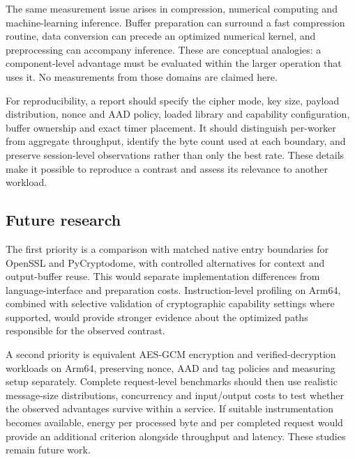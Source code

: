 The same measurement issue arises in compression, numerical computing and machine-learning inference. Buffer preparation can surround a fast compression routine, data conversion can precede an optimized numerical kernel, and preprocessing can accompany inference. These are conceptual analogies: a component-level advantage must be evaluated within the larger operation that uses it. No measurements from those domains are claimed here.

For reproducibility, a report should specify the cipher mode, key size, payload distribution, nonce and AAD policy, loaded library and capability configuration, buffer ownership and exact timer placement. It should distinguish per-worker from aggregate throughput, identify the byte count used at each boundary, and preserve session-level observations rather than only the best rate. These details make it possible to reproduce a contrast and assess its relevance to another workload.

\subsection{Future research}
The first priority is a comparison with matched native entry boundaries for OpenSSL and PyCryptodome, with controlled alternatives for context and output-buffer reuse. This would separate implementation differences from language-interface and preparation costs. Instruction-level profiling on Arm64, combined with selective validation of cryptographic capability settings where supported, would provide stronger evidence about the optimized paths responsible for the observed contrast.

A second priority is equivalent AES-GCM encryption and verified-decryption workloads on Arm64, preserving nonce, AAD and tag policies and measuring setup separately. Complete request-level benchmarks should then use realistic message-size distributions, concurrency and input/output costs to test whether the observed advantages survive within a service. If suitable instrumentation becomes available, energy per processed byte and per completed request would provide an additional criterion alongside throughput and latency. These studies remain future work.
